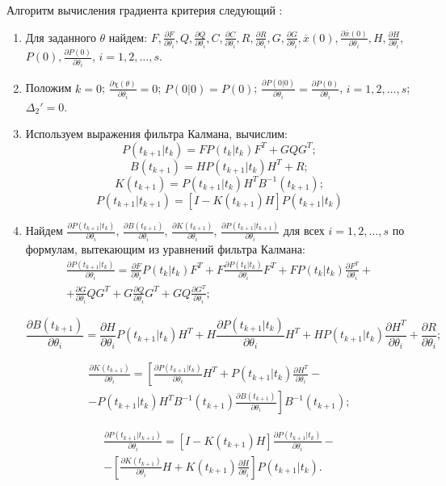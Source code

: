\documentclass[a4paper,14pt]{extarticle}
\newcommand{\pred}[0]{t_{k+1}|t_k}
\newcommand{\fut}[0]{t_{k+1}}
\newcommand{\estfut}[0]{t_{k+1}|t_{k+1}}
\newcommand{\pd}[2]{\frac{\partial #1}{\partial #2}}
\newcommand{\pdpk}[1]{\pd{#1}{\theta_i}}
\newcommand{\inv}[1]{#1^{-1}}
\begin{document}
Алгоритм вычисления градиента критерия следующий \cite{mono}:
\begin{enumerate}
\item Для заданного $\theta$ найдем: $F, \pd{F}{\theta_i}, Q, \pd{Q}{\theta_i},
C, \pd{C}{\theta_i}, R, \pd{R}{\theta_i}, G, \pd{G}{\theta_i}, \overline{x}(0),
\pd{\overline{x}(0)}{\theta_i}, H, \pd{H}{\theta_i}$, $P(0),
\pd{P(0)}{\theta_i}$, $i = 1, 2, \ldots, s$. 

\item Положим $k = 0$; $\pd{\chi(\theta)}{\theta_i} = 0$; $P(0|0) = P(0)$;
$\pd{P(0|0)}{\theta_i} = \pd{P(0)}{\theta_i}$, $i = 1, 2, \ldots, s$;
$\Delta_2' = 0$.

\item Используем выражения фильтра Калмана, вычислим:
\[
  P(t_{k+1}|t_k) = F P(t_k|t_k) F^T + GQG^T;
\]
\[
  B(t_{k+1}) = H P(t_{k+1}|t_k) H^T + R;
\]
\[
  K(t_{k+1}) = P(t_{k+1}|t_k) H^T B^{-1}(t_{k+1});
\]
\[
  P(t_{k+1}|t_{k+1}) = \left[ I - K(t_{k+1}) H \right] P(t_{k+1}|t_k)
\]
\item Найдем $\pd{P(t_{k+1}|t_k)}{\theta_i}$, $\pd{B(t_{k+1})}{\theta_i}$,
$\pd{K(t_{k+1})}{\theta_i}$, $\pd{P(t_{k+1}|t_{k+1})}{\theta_i}$ для всех
$i = 1, 2, \ldots, s$ по формулам, вытекающим из уравнений фильтра Калмана:
\begin{equation*}
\begin{split}
  \pd{P(t_{k+1}|t_k)}{\theta_i} = \pd{F}{\theta_i} P(t_k|t_k) F^T + F
  \pd{P(t_k|t_k)}{\theta_i} F^T + F P(t_k|t_k) \pd{F^T}{\theta_i} + \\ +
  \pd{G}{\theta_i} Q G^T + G \pd{Q}{\theta_i} G^T + G Q \pd{G^T}{\theta_i};
\end{split}
\end{equation*}



\[
  \pdpk{B(t_{k+1})} = \pdpk{H} P(t_{k+1}|t_k) H^T + H \pdpk{P(\pred)} H^T +
  H P(\pred) \pdpk{H^T} + \pdpk{R}; 
\]


\begin{equation*}
\begin{split}
  \pdpk{K(\fut)} = \left[ \pdpk{P(\pred)} H^T + P(\pred) \pdpk{H^T} - \right.
  \\ \left. -
  P(\pred) H^T \inv{B}(\fut) \pdpk{B(\fut)} \right] \inv{B}(\fut); \end{split}
\end{equation*}

\begin{equation*}
\begin{split}
  \pdpk{P(\estfut)} = \left[ I - K(\fut) H \right] \pdpk{P(\pred)} - \\ -
  \left[ \pdpk{K(\fut)} H + K(\fut) \pdpk{H} \right] P(\pred).
\end{split}
\end{equation*}


\end{enumerate}
\end{document}
